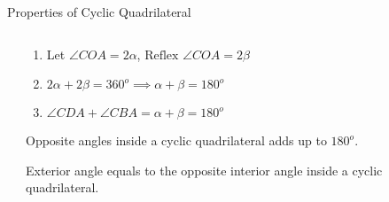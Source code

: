 \documentclass{beamer}
\begin{document}
\begin{frame}{Properties of Cyclic Quadrilateral}
	\begin{columns}
		\begin{center}
			\begin{minipage}{0.9\textwidth}
				\begin{center}
				\end{center}
			\end{minipage}	
		\end{center}
		\begin{center}
			\begin{minipage}{0.9\textwidth}
				\begin{enumerate}
					\item Let $\angle COA = 2\alpha$, $\text{Reflex } \angle COA = 2\beta$
					\pause
					\item $2\alpha + 2\beta = 360^o \implies \alpha + \beta = 180^o$
					\pause
					\item $\angle CDA + \angle CBA = \alpha + \beta = 180^o$
					\pause
				\end{enumerate}
				\begin{theorem}
					Opposite angles inside a cyclic quadrilateral adds up to $180^o$.
				\end{theorem}
				\begin{Corollary}
					Exterior angle equals to the opposite interior angle inside a cyclic quadrilateral.
				\end{Corollary}
			\end{minipage}
		\end{center}
	\end{columns}
\end{frame}
\end{document}
